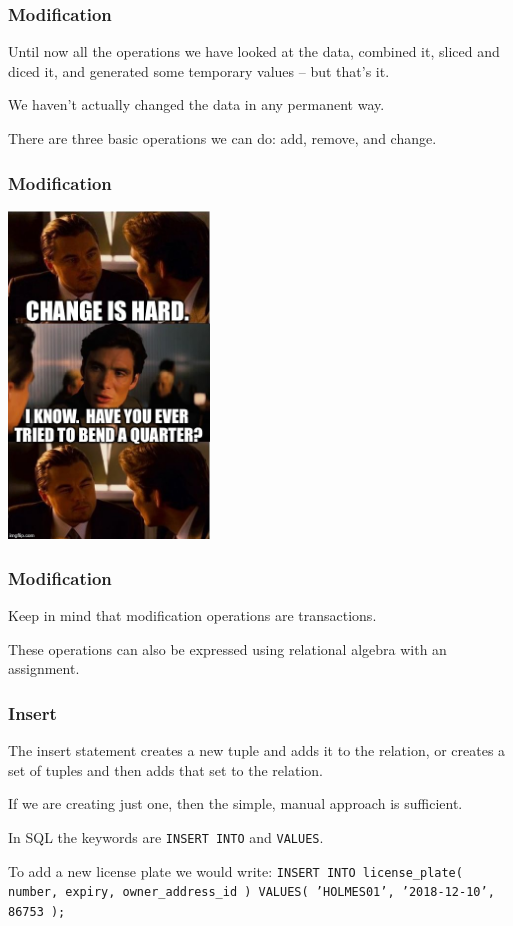 \begin{frame}
\frametitle{Modification}

Until now all the operations we have looked at the data, combined it, sliced and diced it, and generated some temporary values -- but that's it. 

We haven't actually changed the data in any permanent way. 

There are three basic operations we can do: add, remove, and change.
\end{frame}



\begin{frame}
\frametitle{Modification}

\begin{center}
	\includegraphics[width=0.4\textwidth]{images/change-hard.jpg}
\end{center}

\end{frame}



\begin{frame}
\frametitle{Modification}

Keep in mind that modification operations are transactions. 

These operations can also be expressed using relational algebra with an assignment. 

\end{frame}



\begin{frame}
\frametitle{Insert}

The insert statement creates a new tuple and adds it to the relation, or creates a set of tuples and then adds that set to the relation.

If we are creating just one, then the simple, manual approach is sufficient. 

In SQL the keywords are \texttt{INSERT INTO} and \texttt{VALUES}. 

To add a new license plate we would write: \texttt{INSERT INTO license\_plate( number, expiry, owner\_address\_id ) VALUES( 'HOLMES01', '2018-12-10', 86753 );} 

\end{frame}



